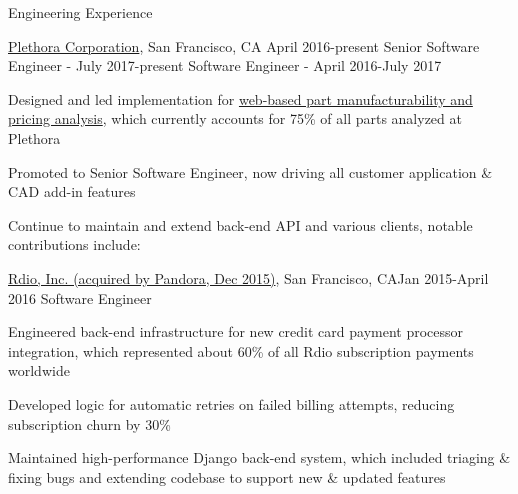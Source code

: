 \documentclass{resume} %
\begin{document}

\begin{rSection}{Engineering Experience}

\begin{rSubsection}{\href{https://www.plethora.com/}{Plethora Corporation}, San Francisco, CA} {April 2016-present} {Senior Software Engineer} {- July 2017-present} {Software Engineer} {- April 2016-July 2017}

\item Designed and led implementation for \href{https://www.plethora.com/upload}{web-based part manufacturability and pricing analysis}, which currently accounts for 75\% of all parts analyzed at Plethora
\item Promoted to Senior Software Engineer, now driving all customer application \& CAD add-in features
\item Continue to maintain and extend back-end API and various clients, notable contributions include: \vspace{-1.5ex}
\subitem \vspace{-1.5ex}{- introducing real-time factory state updates using web sockets}
\subitem {}

\end{rSubsection}

\begin{rSubsection}{\href{https://www.pandora.com/}{Rdio, Inc. (acquired by Pandora, Dec 2015)}, San Francisco, CA}{Jan 2015-April 2016} {Software Engineer} {} {}

\item Engineered back-end infrastructure for new credit card payment processor integration, which represented about 60\% of all Rdio subscription payments worldwide
\item Developed logic for automatic retries on failed billing attempts, reducing subscription churn by 30\%
\item Maintained high-performance Django back-end system, which included triaging \& fixing bugs and extending codebase to support new \& updated features
\end{rSubsection}


\end{rSection}
\end{document}

